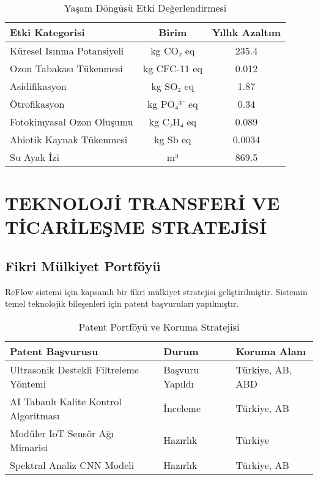 \documentclass[12pt,a4paper]{article}
\begin{document}
\begin{table}[h]
\centering
\caption{Yaşam Döngüsü Etki Değerlendirmesi}
\begin{tabular}{lcc}
\toprule
\textbf{Etki Kategorisi} & \textbf{Birim} & \textbf{Yıllık Azaltım} \\
\midrule
Küresel Isınma Potansiyeli & kg CO₂ eq & 235.4 \\
Ozon Tabakası Tükenmesi & kg CFC-11 eq & 0.012 \\
Asidifikasyon & kg SO₂ eq & 1.87 \\
Ötrofikasyon & kg PO₄³⁻ eq & 0.34 \\
Fotokimyasal Ozon Oluşumu & kg C₂H₄ eq & 0.089 \\
Abiotik Kaynak Tükenmesi & kg Sb eq & 0.0034 \\
Su Ayak İzi & m³ & 869.5 \\
\bottomrule
\end{tabular}
\end{table}

\section{TEKNOLOJİ TRANSFERİ VE TİCARİLEŞME STRATEJİSİ}

\subsection{Fikri Mülkiyet Portföyü}

ReFlow sistemi için kapsamlı bir fikri mülkiyet stratejisi geliştirilmiştir. Sistemin temel teknolojik bileşenleri için patent başvuruları yapılmıştır.

\begin{table}[h]
\centering
\caption{Patent Portföyü ve Koruma Stratejisi}
\begin{tabular}{lll}
\toprule
\textbf{Patent Başvurusu} & \textbf{Durum} & \textbf{Koruma Alanı} \\
\midrule
Ultrasonik Destekli Filtreleme Yöntemi & Başvuru Yapıldı & Türkiye, AB, ABD \\
AI Tabanlı Kalite Kontrol Algoritması & İnceleme & Türkiye, AB \\
Modüler IoT Sensör Ağı Mimarisi & Hazırlık & Türkiye \\
Spektral Analiz CNN Modeli & Hazırlık & Türkiye, AB \\
\bottomrule
\end{tabular}
\end{table}
\end{document}
